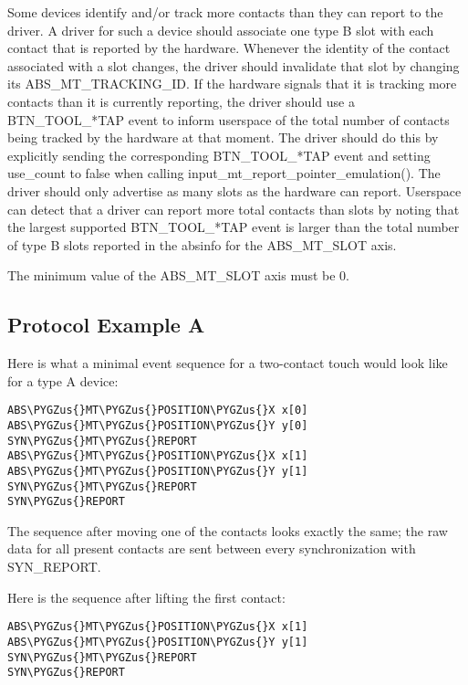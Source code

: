 \documentclass[a4paper,8pt,english]{sphinxmanual}
\def\PYGZus{\char`\_}
\begin{document}
Some devices identify and/or track more contacts than they can report to the
driver.  A driver for such a device should associate one type B slot with each
contact that is reported by the hardware.  Whenever the identity of the
contact associated with a slot changes, the driver should invalidate that
slot by changing its ABS\_MT\_TRACKING\_ID.  If the hardware signals that it is
tracking more contacts than it is currently reporting, the driver should use
a BTN\_TOOL\_*TAP event to inform userspace of the total number of contacts
being tracked by the hardware at that moment.  The driver should do this by
explicitly sending the corresponding BTN\_TOOL\_*TAP event and setting
use\_count to false when calling input\_mt\_report\_pointer\_emulation().
The driver should only advertise as many slots as the hardware can report.
Userspace can detect that a driver can report more total contacts than slots
by noting that the largest supported BTN\_TOOL\_*TAP event is larger than the
total number of type B slots reported in the absinfo for the ABS\_MT\_SLOT axis.

The minimum value of the ABS\_MT\_SLOT axis must be 0.


\subsection{Protocol Example A}
\label{input/multi-touch-protocol:protocol-example-a}
Here is what a minimal event sequence for a two-contact touch would look
like for a type A device:

\begin{Verbatim}[commandchars=\\\{\}]
ABS\PYGZus{}MT\PYGZus{}POSITION\PYGZus{}X x[0]
ABS\PYGZus{}MT\PYGZus{}POSITION\PYGZus{}Y y[0]
SYN\PYGZus{}MT\PYGZus{}REPORT
ABS\PYGZus{}MT\PYGZus{}POSITION\PYGZus{}X x[1]
ABS\PYGZus{}MT\PYGZus{}POSITION\PYGZus{}Y y[1]
SYN\PYGZus{}MT\PYGZus{}REPORT
SYN\PYGZus{}REPORT
\end{Verbatim}

The sequence after moving one of the contacts looks exactly the same; the
raw data for all present contacts are sent between every synchronization
with SYN\_REPORT.

Here is the sequence after lifting the first contact:

\begin{Verbatim}[commandchars=\\\{\}]
ABS\PYGZus{}MT\PYGZus{}POSITION\PYGZus{}X x[1]
ABS\PYGZus{}MT\PYGZus{}POSITION\PYGZus{}Y y[1]
SYN\PYGZus{}MT\PYGZus{}REPORT
SYN\PYGZus{}REPORT
\end{Verbatim}
\end{document}
